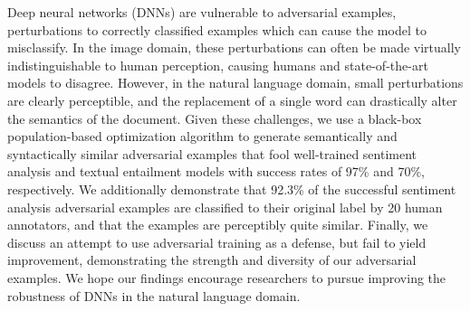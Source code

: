 Deep neural networks (DNNs) are vulnerable to adversarial examples, perturbations to correctly classified examples which can cause the model to misclassify. In the image domain, these perturbations can often be made virtually indistinguishable to human perception, causing humans and state-of-the-art models to disagree. However, in the natural language domain, small perturbations are clearly perceptible, and the replacement of a single word can drastically alter the semantics of the document. Given these challenges, we use a black-box population-based optimization algorithm to generate semantically and syntactically similar adversarial examples that fool well-trained sentiment analysis and textual entailment models with success rates of 97\% and 70\%, respectively. We additionally demonstrate that 92.3\% of the successful sentiment analysis adversarial examples are classified to their original label by 20 human annotators, and that the examples are perceptibly quite similar. Finally, we discuss an attempt to use adversarial training as a defense, but fail to yield improvement, demonstrating the strength and diversity of our adversarial examples. We hope our findings encourage researchers to pursue improving the robustness of DNNs in the natural language domain.

